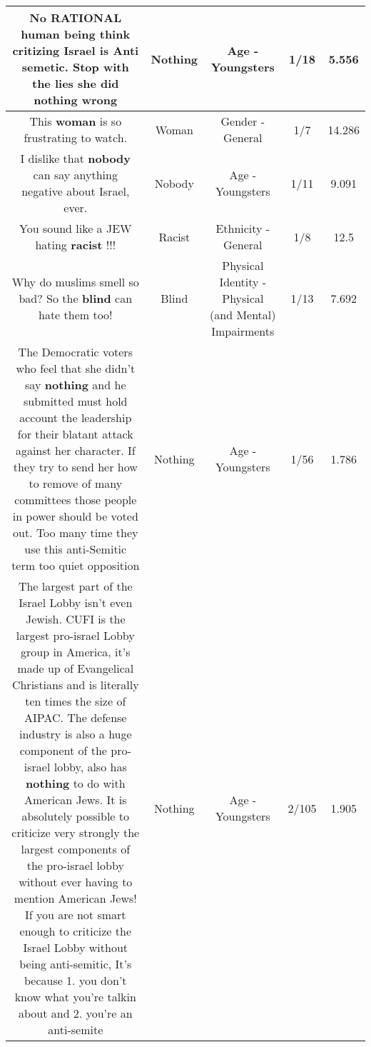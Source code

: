 \documentclass[11pt]{article}
\newlength\mylength
\begin{document}
\begin{center}
\begin{longtable}{|C{.65\mylength}|C{.30\mylength}|C{.12\mylength}|C{.12\mylength}|C{.12\mylength}|}
  \small No RATIONAL human being think critizing Israel is Anti semetic.  Stop with the lies she did \textbf{nothing} wrong\normalsize   & Nothing & Age - Youngsters & 1/18 & 5.556 \\  \hline
  \small This \textbf{woman} is so frustrating to watch.\normalsize   & Woman & Gender - General & 1/7 & 14.286 \\  \hline
  \small I dislike that \textbf{nobody} can say anything negative about Israel, ever.\normalsize   & Nobody & Age - Youngsters & 1/11 & 9.091 \\  \hline
  \small You sound like a JEW hating \textbf{racist} !!!\normalsize   & Racist & Ethnicity - General & 1/8 & 12.5 \\  \hline
  \small Why do muslims smell so bad? So the \textbf{blind} can hate them too!\normalsize   & Blind & Physical Identity - Physical (and Mental) Impairments & 1/13 & 7.692 \\  \hline
  \small The Democratic voters who feel that she didn't say \textbf{nothing} and he submitted must hold account the leadership for their blatant attack against her character. If they try to send her how to remove of many committees those people in power should be voted out. Too many time they use this anti-Semitic term too quiet opposition\normalsize   & Nothing & Age - Youngsters & 1/56 & 1.786 \\  \hline
  \small The largest part of the Israel Lobby isn't even Jewish. CUFI is the largest pro-israel Lobby group in America, it's made up of Evangelical Christians and is literally ten times the size of  AIPAC. The defense industry is also a huge component of the pro-israel lobby, also has \textbf{nothing} to do with American Jews. It is absolutely possible to criticize very strongly the largest components of the pro-israel lobby without ever having to mention American Jews! If you are not smart enough to criticize the Israel Lobby without being anti-semitic, It's because 1. you don't know what you're talkin about and 2. you're an anti-semite\normalsize   & Nothing & Age - Youngsters & 2/105 & 1.905 \\  \hline

\end{longtable}
\end{center}
\end{document}
